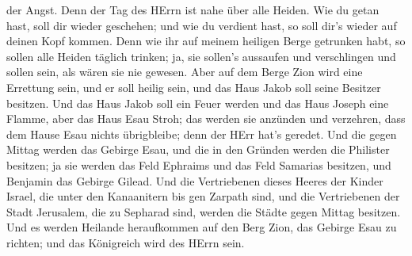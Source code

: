 der Angst.  Denn der Tag des HErrn ist nahe über alle
Heiden. Wie du getan hast, soll dir wieder geschehen; und wie du
verdient hast, so soll dir's wieder auf deinen Kopf kommen.
 Denn wie ihr auf meinem heiligen Berge getrunken habt, so
sollen alle Heiden täglich trinken; ja, sie sollen's aussaufen und
verschlingen und sollen sein, als wären sie nie gewesen. 
Aber auf dem Berge Zion wird eine Errettung sein, und er soll heilig
sein, und das Haus Jakob soll seine Besitzer besitzen.  Und
das Haus Jakob soll ein Feuer werden und das Haus Joseph eine Flamme,
aber das Haus Esau Stroh; das werden sie anzünden und verzehren, dass
dem Hause Esau nichts übrigbleibe; denn der HErr hat's geredet.
 Und die gegen Mittag werden das Gebirge Esau, und die in
den Gründen werden die Philister besitzen; ja sie werden das Feld
Ephraims und das Feld Samarias besitzen, und Benjamin das Gebirge
Gilead.  Und die Vertriebenen dieses Heeres der Kinder
Israel, die unter den Kanaanitern bis gen Zarpath sind, und die
Vertriebenen der Stadt Jerusalem, die zu Sepharad sind, werden die
Städte gegen Mittag besitzen.  Und es werden Heilande
heraufkommen auf den Berg Zion, das Gebirge Esau zu richten; und das
Königreich wird des HErrn sein.
